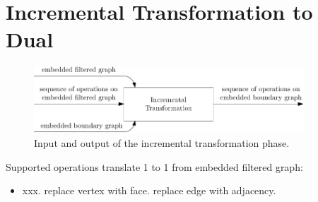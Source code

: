\section{Incremental Transformation to Dual}
\label{sect:incremental-transformation-to-dual}

\lipsum

\begin{figure}[H]
	\centering\includegraphics[width=0.9\textwidth]{Resources/DynamicPipeline-IncrementalTransformation.pdf}
	\caption{Input and output of the incremental transformation phase.}
	\label{fig:dynamic-pipeline-incremental-transformation}
\end{figure}

Supported operations translate 1 to 1 from embedded filtered graph:
%
\begin{itemize}
	\item xxx. replace vertex with face. replace edge with adjacency.
\end{itemize}

